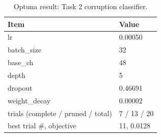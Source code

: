 \begin{table}[t]
\centering
\caption{Optuna result: Task 2 corruption classifier.}
\label{tab:optuna_cls_best}
\footnotesize
\begin{tabular}{ll}
\toprule
Item & Value \\
\midrule
lr & 0.00050 \\
batch\_size & 32 \\
base\_ch & 48 \\
depth & 5 \\
dropout & 0.46691 \\
weight\_decay & 0.00002 \\
trials (complete / pruned / total) & 7 / 13 / 20 \\
best trial \#, objective & 11, 0.0128 \\
\bottomrule
\end{tabular}
\end{table}
